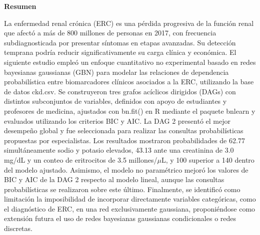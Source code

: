 \small
\noindent\textbf{Resumen}

La enfermedad renal crónica (ERC) es una pérdida progresiva de la función renal que afectó a más de 800 millones de personas en 2017, 
con frecuencia subdiagnosticada por presentar síntomas en etapas avanzadas. Su detección temprana podría reducir significativamente su 
carga clínica y económica. El siguiente estudio empleó un enfoque cuantitativo no experimental basado en redes bayesianas gaussianas (GBN) 
para modelar las relaciones de dependencia probabilística entre biomarcadores clínicos asociados a la ERC, utilizando la base de datos 
ckd.csv. Se construyeron tres grafos acíclicos dirigidos (DAGs) con distintos subconjuntos de variables, definidos con apoyo de estudiantes 
y profesores de medicina, ajustados con bn.fit() en R mediante el paquete bnlearn y evaluados utilizando los criterios BIC y AIC. La DAG 2 
presentó el mejor desempeño global y fue seleccionada para realizar las consultas probabilísticas propuestas por especialistas. Los 
resultados mostraron probabilidades de 62.77 %
simultáneamente sodio y potasio elevados, 43.13 %
ante una creatinina de 3.0 mg/dL y un conteo de eritrocitos de 3.5 millones/\(\mu\)L, y 100 %
superior a 140 dentro del modelo ajustado. Asimismo, el modelo no paramétrico mejoró los valores de BIC y AIC de la DAG 2 respecto al modelo 
lineal, aunque las consultas probabilísticas se realizaron sobre este último. Finalmente, se identificó como limitación la imposibilidad de 
incorporar directamente variables categóricas, como el diagnóstico de ERC, en una red exclusivamente gaussiana, proponiéndose como extensión 
futura el uso de redes bayesianas gaussianas condicionales o redes discretas.
